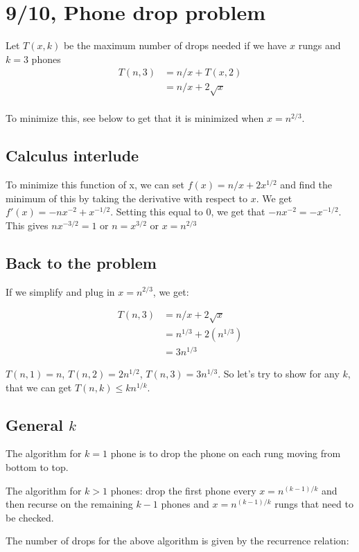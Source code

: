 \documentclass{article}
\begin{document}
\section{9/10, Phone drop problem}
Let $T(x,k)$ be the maximum number of drops needed if we have $x$ rungs and $k=3$ phones
\begin{align*}
    T(n,3) & = n/x + T(x,2)\\
           & = n/x + 2 \sqrt{x}\\
\end{align*}

To minimize this, see below to get that it is minimized when $x = n^{2/3}$.

\subsection{Calculus interlude}
To minimize this function of x, we can set $f(x) = n/x + 2x^{1/2}$ and find the minimum of this by taking the derivative with respect to $x$.  We get $f'(x) = -n x^{-2} + x^{-1/2}$.  Setting this equal to $0$, we get that $-nx^{-2} = - x^{-1/2}$.   This gives $nx^{-3/2} = 1$ or $n = x^{3/2}$ or $x = n^{2/3}$

\subsection{Back to the problem}

If we simplify and plug in $x = n^{2/3}$, we get:

\begin{align*}
    T(n,3) & = n/x + 2 \sqrt{x}\\
    & = n^{1/3} + 2 (n^{1/3})\\
    & = 3n^{1/3}
\end{align*}

$T(n,1) = n$, $T(n,2) = 2 n^{1/2}$, $T(n,3) = 3 n^{1/3}$.  So let's try to show for any $k$, that we can get $T(n,k) \leq k n^{1/k}$.

\subsection{General $k$}
The algorithm for $k=1$ phone is to drop the phone on each rung moving from bottom to top.

The algorithm for $k>1$ phones: drop the first phone every $x = n^{(k-1)/k}$ and then recurse on the remaining $k-1$ phones and $x = n^{(k-1)/k}$ rungs that need to be checked.

The number of drops for the above algorithm is given by the recurrence relation:
\end{document}

